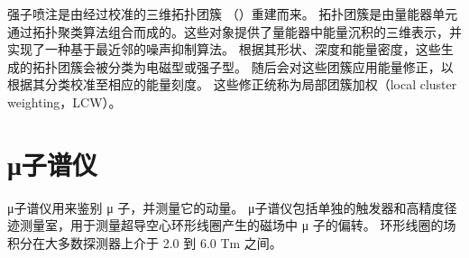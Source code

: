 强子喷注是由经过校准的三维拓扑团簇 （\topos）重建而来。
拓扑团簇是由量能器单元通过拓扑聚类算法组合而成的。这些对象提供了量能器中能量沉积的三维表示，并实现了一种基于最近邻的噪声抑制算法。
根据其形状、深度和能量密度，这些生成的拓扑团簇会被分类为电磁型或强子型。
随后会对这些团簇应用能量修正，以根据其分类校准至相应的能量刻度。
这些修正统称为局部团簇加权（local cluster weighting，LCW）\cite{Boccardi:1411357}。

\section{μ子谱仪}
μ子谱仪用来鉴别 μ 子，并测量它的动量。
μ子谱仪包括单独的触发器和高精度径迹测量室，用于测量超导空心环形线圈产生的磁场中 μ 子的偏转。
环形线圈的场积分在大多数探测器上介于 2.0 到 6.0 Tm 之间。
